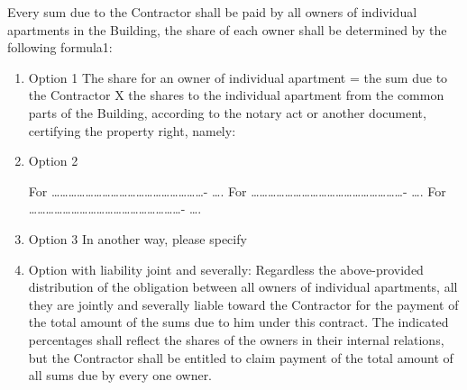 Every sum due to the Contractor shall be paid by all owners of individual apartments in the Building, the share of each owner shall be determined by the following formula1: \\
\begin{enumerate}
\item Option 1 The share for an owner of individual apartment = the
  sum due to the Contractor X the shares to the individual apartment
  from the common parts of the Building, according to the notary act
  or another document, certifying the property right, namely:
\item Option 2

  For ………………………………………………- …. %
  For ………………………………………………- …. %
  For ………………………………………………- …. %

\item Option 3 In another way, please specify
\item Option with liability joint and severally: Regardless the
  above-provided distribution of the obligation between all owners of
  individual apartments, all they are jointly and severally liable
  toward the Contractor for the payment of the total amount of the
  sums due to him under this contract. The indicated percentages shall
  reflect the shares of the owners in their internal relations, but
  the Contractor shall be entitled to claim payment of the total
  amount of all sums due by every one owner.
\end{enumerate}
